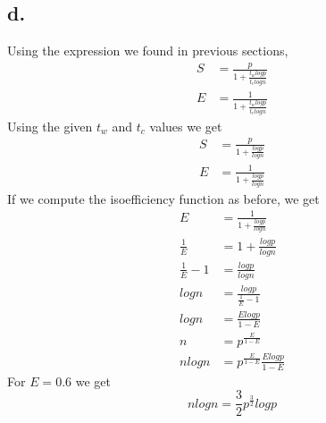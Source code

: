 \documentclass[11pt]{article}
\begin{document}
\subsection*{d.}
Using the expression we found in previous sections,
\begin{align*}
    S&= \frac{p}{1+\frac{t_wlogp}{t_clogn}}\\
    E&= \frac{1}{1+\frac{t_wlogp}{t_clogn}}
\end{align*}
Using the given $t_w$ and $t_c$ values we get
\begin{align*}
    S&= \frac{p}{1+\frac{logp}{logn}}\\
    E&= \frac{1}{1+\frac{logp}{logn}}
\end{align*}
If we compute the isoefficiency function as before, we get
\begin{align*}
    E&= \frac{1}{1+\frac{logp}{logn}} \\
    \frac{1}{E}&=1+\frac{logp}{logn} \\
    \frac{1}{E}-1&=\frac{logp}{logn}\\
    logn&=\frac{logp}{\frac{1}{E}-1}\\
    logn&=\frac{Elogp}{1-E}\\
    n&=p^\frac{E}{1-E}\\
    nlogn&=p^\frac{E}{1-E}\frac{Elogp}{1-E}
\end{align*}
For $E=0.6$ we get
\[
    nlogn=\frac{3}{2}p^\frac{3}{2}logp
\]
\end{document}
